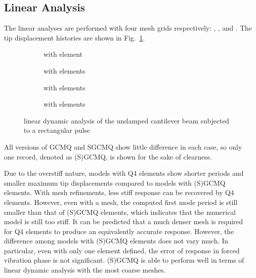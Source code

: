 \documentclass[3p,sort&compress,review,11pt,fleqn]{elsarticle}
\newcommand*{\figref}[1]{Fig.~\ref{#1}}
\begin{document}
\subsection{Linear Analysis}
The linear analyses are performed with four mesh grids respectively: , ,  and . The tip displacement histories are shown in \figref{fig:cantilever_disp}.
\begin{figure}[htb]
\centering\scriptsize
\begin{subfigure}{.49\textwidth}\centering

\caption{with  element}
\end{subfigure}\hfill
\begin{subfigure}{.49\textwidth}\centering

\caption{with  elements}
\end{subfigure}\vspace*{4mm}
\begin{subfigure}{.49\textwidth}\centering

\caption{with  elements}
\end{subfigure}\hfill
\begin{subfigure}{.49\textwidth}\centering

\caption{with  elements}
\end{subfigure}
\caption{linear dynamic analysis of the undamped cantilever beam subjected to a rectangular pulse}\label{fig:cantilever_disp}
\end{figure}
All versions of GCMQ and SGCMQ show little difference in each case, so only one record, denoted as (S)GCMQ, is shown for the sake of clearness.

Due to the overstiff nature, models with Q4 elements show shorter periods and smaller maximum tip displacements compared to models with (S)GCMQ elements. With mesh refinements, less stiff response can be recovered by Q4 elements. However, even with a  mesh, the computed first mode period is still smaller than that of (S)GCMQ elements, which indicates that the numerical model is still too stiff. It can be predicted that a much denser mesh is required for Q4 elements to produce an equivalently accurate response. However, the difference among models with (S)GCMQ elements does not vary much. In particular, even with only one element defined, the error of response in forced vibration phase is not significant. (S)GCMQ is able to perform well in terms of linear dynamic analysis with the most coarse meshes.
\end{document}
